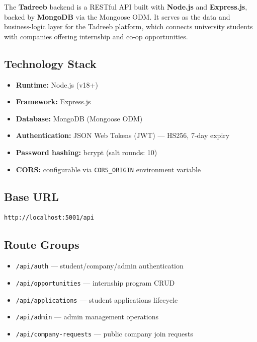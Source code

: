 \documentclass[12pt,a4paper]{article}
\begin{document}
The \textbf{Tadreeb} backend is a RESTful API built with \textbf{Node.js} and \textbf{Express.js}, backed by \textbf{MongoDB} via the Mongoose ODM. It serves as the data and business-logic layer for the Tadreeb platform, which connects university students with companies offering internship and co-op opportunities.

\subsection*{Technology Stack}
\begin{itemize}[leftmargin=1.5cm]
  \item \textbf{Runtime:} Node.js (v18+)
  \item \textbf{Framework:} Express.js
  \item \textbf{Database:} MongoDB (Mongoose ODM)
  \item \textbf{Authentication:} JSON Web Tokens (JWT) — HS256, 7-day expiry
  \item \textbf{Password hashing:} bcrypt (salt rounds: 10)
  \item \textbf{CORS:} configurable via \texttt{CORS\_ORIGIN} environment variable
\end{itemize}

\subsection*{Base URL}
\begin{lstlisting}
http://localhost:5001/api
\end{lstlisting}

\subsection*{Route Groups}
\begin{itemize}[leftmargin=1.5cm]
  \item \texttt{/api/auth} — student/company/admin authentication
  \item \texttt{/api/opportunities} — internship program CRUD
  \item \texttt{/api/applications} — student applications lifecycle
  \item \texttt{/api/admin} — admin management operations
  \item \texttt{/api/company-requests} — public company join requests
\end{itemize}
\end{document}
